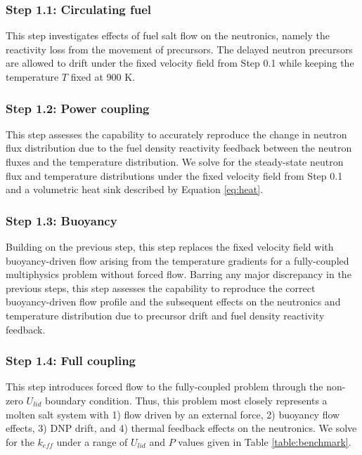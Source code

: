 \subsubsection{Step 1.1: Circulating fuel}

This step investigates effects of fuel salt flow on the neutronics,
namely the reactivity loss from the movement of precursors. The delayed neutron
precursors are allowed to drift under the fixed velocity field from Step 0.1
while keeping the temperature $T$ fixed at 900 K. 

\subsubsection{Step 1.2: Power coupling}

This step assesses the capability to accurately reproduce the change in
neutron flux distribution due to the fuel density reactivity feedback between
the neutron fluxes and the temperature distribution. We solve for the
steady-state neutron flux and temperature distributions under the fixed
velocity field from Step 0.1 and a volumetric heat sink described by Equation
\ref{eq:heat}.

\subsubsection{Step 1.3: Buoyancy}

Building on the previous step, this step replaces the fixed velocity field with
buoyancy-driven flow arising from the temperature gradients for a fully-coupled
multiphysics problem without forced flow. Barring any major discrepancy in the
previous steps, this step assesses the capability to reproduce the correct
buoyancy-driven flow profile and the subsequent effects on the neutronics and
temperature distribution due to precursor drift and fuel density reactivity
feedback.

\subsubsection{Step 1.4: Full coupling}

This step introduces forced flow to the fully-coupled problem through the
non-zero $U_{lid}$ boundary
condition. Thus, this problem most closely represents a molten salt system with
1) flow driven by an external force, 2) buoyancy flow effects, 3) \gls{DNP}
drift, and 4) thermal feedback effects on the neutronics. We solve for the
$k_{eff}$ under a range of $U_{lid}$ and $P$ values given in Table
\ref{table:benchmark}.

